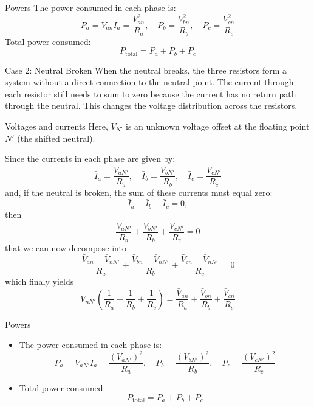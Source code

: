 \begin{frame}{Powers}
    The power consumed in each phase is:
    $$P_a = V_{an} I_a = \frac{V_{an}^2}{R_a}, \quad P_b = \frac{V_{bn}^2}{R_b}, \quad P_c = \frac{V_{cn}^2}{R_c}$$
    Total power consumed:
    $$P_{\text{total}} = P_a + P_b + P_c$$
\end{frame}

\begin{frame}{Case 2: Neutral Broken}
    When the neutral breaks, the three resistors form a system without a direct connection to the neutral point. The current through each resistor still needs to sum to zero because the current has no return path through the neutral. This changes the voltage distribution across the resistors.
\end{frame}

\begin{frame}[allowframebreaks]{Voltages and currents}
    Here, $\bar{V}_{N'} $ is an unknown voltage offset at the floating point $N'$ (the shifted neutral). 
    
    Since the currents in each phase are given by:
    $$
    \bar{I}_a = \frac{\bar{V}_{aN'}}{R_a}, \quad \bar{I}_b = \frac{\bar{V}_{bN'}}{R_b}, \quad \bar{I}_c = \frac{\bar{V}_{cN'}}{R_c}
    $$
    and, if the neutral is broken, the sum of these currents must equal zero:
    $$
    \bar{I}_a + \bar{I}_b + \bar{I}_c = 0,
    $$
    then 
    \begin{equation}
    \frac{\bar{V}_{aN'}}{R_a} + \frac{\bar{V}_{bN'}}{R_b} + \frac{\bar{V}_{cN'}}{R_c} = 0 \label{eq:neutral_break_KCL}    
    \end{equation}
    that we can now decompose into
    $$
    \frac{\bar{V}_{an}-\bar{V}_{nN'}}{R_a} + \frac{\bar{V}_{bn}-\bar{V}_{nN'}}{R_b} + \frac{\bar{V}_{cn}-\bar{V}_{nN'}}{R_c} = 0 \label{eq:neutral_break_KCL}    
    $$
    which finaly yields
    $$
    \bar{V}_{nN'} \left(\frac{1}{R_a}+\frac{1}{R_b}+\frac{1}{R_c}\right) =     \frac{\bar{V}_{an}}{R_a} + \frac{\bar{V}_{bn}}{R_b} + \frac{\bar{V}_{cn}}{R_c} 
    $$

\end{frame}

\begin{frame}{Powers}
    \begin{itemize}
        \item The power consumed in each phase is:
        $$
        P_a = V_{aN'} I_a = \frac{(V_{aN'})^2}{R_a}, \quad P_b = \frac{(V_{bN'})^2}{R_b}, \quad P_c = \frac{(V_{cN'})^2}{R_c}
        $$
        \item Total power consumed:
        $$
        P_{\text{total}} = P_a + P_b + P_c
        $$
    \end{itemize}
\end{frame}


